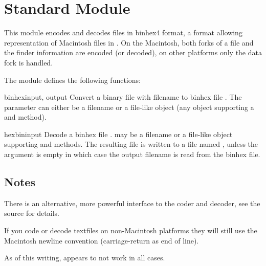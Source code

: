 \section{Standard Module }



This module encodes and decodes files in binhex4 format, a format
allowing representation of Macintosh files in \ASCII{}. On the Macintosh,
both forks of a file and the finder information are encoded (or
decoded), on other platforms only the data fork is handled.

The  module defines the following functions:

\begin{funcdesc}{binhex}{input, output}
Convert a binary file with filename  to binhex file
. The  parameter can either be a filename or a
file-like object (any object supporting a  and 
method).
\end{funcdesc}

\begin{funcdesc}{hexbin}{input}
Decode a binhex file .  may be a filename or a
file-like object supporting  and  methods.
The resulting file is written to a file named , unless the
argument is empty in which case the output filename is read from the
binhex file.
\end{funcdesc}

\subsection{Notes}
There is an alternative, more powerful interface to the coder and
decoder, see the source for details.

If you code or decode textfiles on non-Macintosh platforms they will
still use the Macintosh newline convention (carriage-return as end of
line).

As of this writing,  appears to not work in all
cases.
